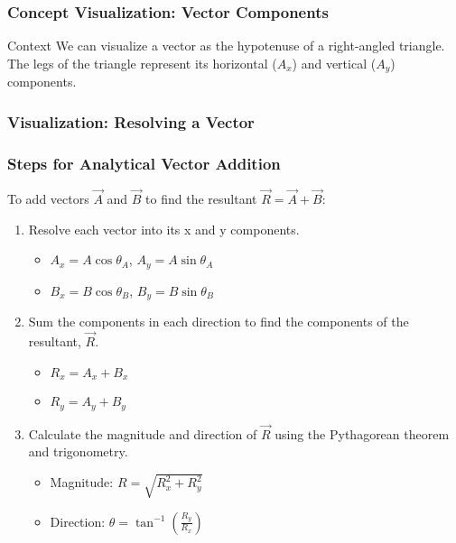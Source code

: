 \documentclass{beamer}
\begin{document}
\begin{frame}
\frametitle{Concept Visualization: Vector Components}
\begin{block}{Context}
    We can visualize a vector as the hypotenuse of a right-angled triangle. The legs of the triangle represent its horizontal ($A_x$) and vertical ($A_y$) components.
\end{block}
\end{frame}

\begin{frame}
\frametitle{Visualization: Resolving a Vector}
\centering
{}
\end{frame}

\begin{frame}
\frametitle{Steps for Analytical Vector Addition}
To add vectors $\vec{A}$ and $\vec{B}$ to find the resultant $\vec{R} = \vec{A} + \vec{B}$:

\begin{enumerate}
    \item \alert{Resolve} each vector into its x and y components.
    \begin{itemize}
        \item $A_x = A \cos \theta_A$, $A_y = A \sin \theta_A$
        \item $B_x = B \cos \theta_B$, $B_y = B \sin \theta_B$
    \end{itemize}
    \pause
    \item \alert{Sum} the components in each direction to find the components of the resultant, $\vec{R}$.
    \begin{itemize}
        \item $R_x = A_x + B_x$
        \item $R_y = A_y + B_y$
    \end{itemize}
    \pause
    \item \alert{Calculate} the magnitude and direction of $\vec{R}$ using the Pythagorean theorem and trigonometry.
    \begin{itemize}
        \item Magnitude: $R = \sqrt{R_x^2 + R_y^2}$
        \item Direction: $\theta = \tan^{-1}\left(\frac{R_y}{R_x}\right)$
    \end{itemize}
\end{enumerate}
\end{frame}
\end{document}
